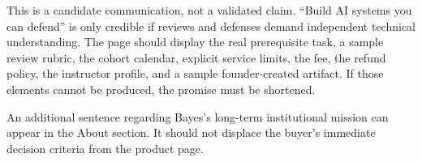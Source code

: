 This is a candidate communication, not a validated claim. ``Build AI systems you can defend'' is only credible if reviews and defenses demand independent technical understanding. The page should display the real prerequisite task, a sample review rubric, the cohort calendar, explicit service limits, the fee, the refund policy, the instructor profile, and a sample founder-created artifact. If those elements cannot be produced, the promise must be shortened.

An additional sentence regarding Bayes's long-term institutional mission can appear in the About section. It should not displace the buyer's immediate decision criteria from the product page.
